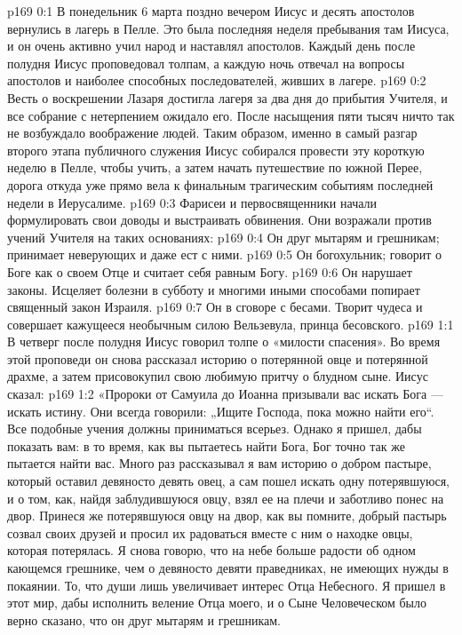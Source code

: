 \author{Комиссия срединников}
\vs p169 0:1 В понедельник 6 марта поздно вечером Иисус и десять апостолов вернулись в лагерь в Пелле. Это была последняя неделя пребывания там Иисуса, и он очень активно учил народ и наставлял апостолов. Каждый день после полудня Иисус проповедовал толпам, а каждую ночь отвечал на вопросы апостолов и наиболее способных последователей, живших в лагере.
\vs p169 0:2 Весть о воскрешении Лазаря достигла лагеря за два дня до прибытия Учителя, и все собрание с нетерпением ожидало его. После насыщения пяти тысяч ничто так не возбуждало воображение людей. Таким образом, именно в самый разгар второго этапа публичного служения Иисус собирался провести эту короткую неделю в Пелле, чтобы учить, а затем начать путешествие по южной Перее, дорога откуда уже прямо вела к финальным трагическим событиям последней недели в Иерусалиме.
\vs p169 0:3 \pc Фарисеи и первосвященники начали формулировать свои доводы и выстраивать обвинения. Они возражали против учений Учителя на таких основаниях:
\vs p169 0:4 \bibnobreakspace Он друг мытарям и грешникам; принимает неверующих и даже ест с ними.
\vs p169 0:5 \bibnobreakspace Он богохульник; говорит о Боге как о своем Отце и считает себя равным Богу.
\vs p169 0:6 \bibnobreakspace Он нарушает законы. Исцеляет болезни в субботу и многими иными способами попирает священный закон Израиля.
\vs p169 0:7 \bibnobreakspace Он в сговоре с бесами. Творит чудеса и совершает кажущееся необычным силою Вельзевула, принца бесовского.
\vs p169 1:1 В четверг после полудня Иисус говорил толпе о «милости спасения». Во время этой проповеди он снова рассказал историю о потерянной овце и потерянной драхме, а затем присовокупил свою любимую притчу о блудном сыне. Иисус сказал:
\vs p169 1:2 \pc «Пророки от Самуила до Иоанна призывали вас искать Бога --- искать истину. Они всегда говорили: „Ищите Господа, пока можно найти его“. Все подобные учения должны приниматься всерьез. Однако я пришел, дабы показать вам: в то время, как вы пытаетесь найти Бога, Бог точно так же пытается найти вас. Много раз рассказывал я вам историю о добром пастыре, который оставил девяносто девять овец, а сам пошел искать одну потерявшуюся, и о том, как, найдя заблудившуюся овцу, взял ее на плечи и заботливо понес на двор. Принеся же потерявшуюся овцу на двор, как вы помните, добрый пастырь созвал своих друзей и просил их радоваться вместе с ним о находке овцы, которая потерялась. Я снова говорю, что на небе больше радости об одном кающемся грешнике, чем о девяносто девяти праведниках, не имеющих нужды в покаянии. То, что души  лишь увеличивает интерес Отца Небесного. Я пришел в этот мир, дабы исполнить веление Отца моего, и о Сыне Человеческом было верно сказано, что он друг мытарям и грешникам.

